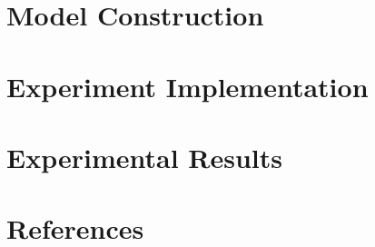 \documentclass{article}
\theoremstyle{definition}
\begin{document}
\section{Model Construction}\label{sec:model}

\section{Experiment Implementation}\label{sec:implementation}

\section{Experimental Results}\label{sec:results}

\section{References}

\begin{thebibliography}{99}
\end{thebibliography}
\end{document}
